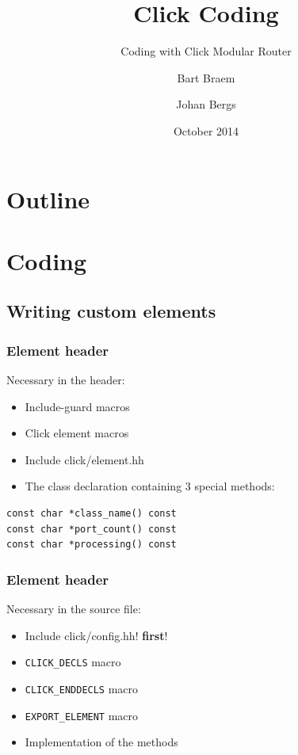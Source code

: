 \documentclass{beamer}
\title{Click Coding}
\subtitle{Coding with Click Modular Router}
\author{Bart Braem \and Johan Bergs}
\institute{University of Antwerp\\iMinds - MOSAIC Research Group}
\date{October 2014}
\begin{document}
\lstset{breakatwhitespace=true}
\lstset{language=C++}
\lstset{columns=fullflexible}
\lstset{keepspaces=true}
\lstset{breaklines=true,
        tabsize=3, 
        showstringspaces=false,
extendedchars=\true}

\begin{frame}[t]
\titlepage
\end{frame}


\section*{Outline}


\section{Coding}
\subsection{Writing custom elements} %
\label{sub:writing_custom_elements}

\begin{frame}[fragile]
\frametitle{Element header}
Necessary in the header:
\begin{itemize}
	\item Include-guard macros
	\item Click element macros
	\item Include click/element.hh
	\item The class declaration containing 3 special methods:
\end{itemize}
\begin{lstlisting}
const char *class_name() const
const char *port_count() const
const char *processing() const
\end{lstlisting}
\end{frame}

\begin{frame}[fragile]
\frametitle{Element header}
Necessary in the source file:
\begin{itemize}
	\item Include \!click/config.hh! \textbf{first}!
	\item \lstinline!CLICK_DECLS! macro
	\item \lstinline!CLICK_ENDDECLS! macro
	\item \lstinline!EXPORT_ELEMENT! macro
	\item Implementation of the methods
\end{itemize}
\end{frame}
\end{document}
